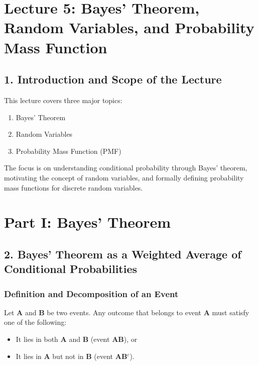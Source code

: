 \documentclass[12pt]{article}
\begin{document}
\section*{Lecture 5: Bayes’ Theorem, Random Variables, and Probability Mass Function}

\hrulefill

\subsection*{1. Introduction and Scope of the Lecture}

This lecture covers three major topics:

\begin{enumerate}
    \item Bayes’ Theorem
    \item Random Variables
    \item Probability Mass Function (PMF)
\end{enumerate}

The focus is on understanding conditional probability through Bayes’ theorem, motivating the concept of random variables, and formally defining probability mass functions for discrete random variables.

\hrulefill

\section*{Part I: Bayes’ Theorem}

\subsection*{2. Bayes’ Theorem as a Weighted Average of Conditional Probabilities}

\subsubsection*{Definition and Decomposition of an Event}

Let \textbf{A} and \textbf{B} be two events. Any outcome that belongs to event \textbf{A} must satisfy one of the following:

\begin{itemize}
    \item It lies in both \textbf{A} and \textbf{B} (event \textbf{AB}), or
    \item It lies in \textbf{A} but not in \textbf{B} (event \textbf{AB}$^{c}$).
\end{itemize}
\end{document}
